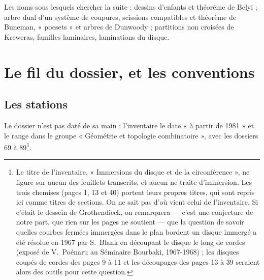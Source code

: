 \documentclass[11pt,a4paper]{article}
\begin{document}
\begin{resume}
Les noms sous lesquels chercher la suite : dessins d'enfants et théorème de
Belyi ; arbre dual d'un système de coupures, scissions compatibles et
théorème de Buneman, « pocsets » et arbres de Dunwoody ; partitions non
croisées de Kreweras, familles laminaires, laminations du disque.

\end{resume}

\section*{Le fil du dossier, et les conventions}

\subsection*{Les stations}

Le dossier n'est pas daté de sa main ; l'inventaire le date « à partir de
1981 » et le range dans le groupe « Géométrie et topologie combinatoire »,
avec les dossiers 69 à 89\footnote{Le titre de l'inventaire, « Immersions du
disque et de la circonférence », ne figure sur aucun des feuillets
transcrits, et aucun ne traite d'immersion. Les trois chemises (pages 1, 13
et 40) portent leurs propres titres, qui sont repris ici comme titres de
sections. On ne sait pas d'où vient celui de l'inventaire. Si c'était le
dessein de Grothendieck, on remarquera --- c'est une conjecture de notre part,
que rien sur les pages ne soutient --- que la question de savoir quelles
courbes fermées immergées dans le plan bordent un disque immergé a été
résolue en 1967 par S.~Blank en découpant le disque le long de cordes
(exposé de V.~Poénaru au Séminaire Bourbaki, 1967-1968) ; les disques coupés
de cordes des pages 9 à 11 et les découpages des pages 13 à 39 seraient
alors des outils pour cette question.}.
\end{document}
